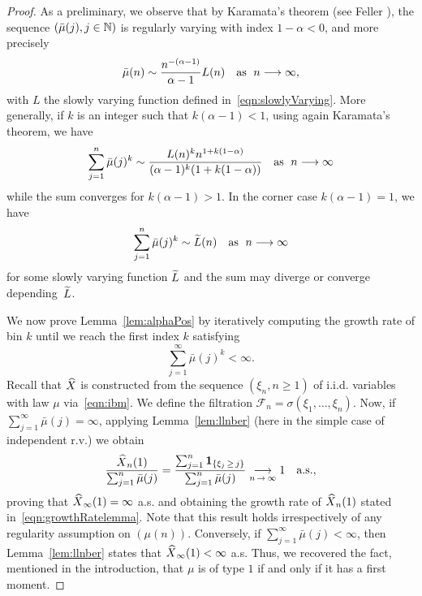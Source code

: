 \documentclass[AHL,Unicode,longabstracts,published]{cedram}
\newcommand{\bbN}{\mathbb{N}}
\newcommand{\ind}[1]{\mathbf{1}_{\left\{#1\right\}}}
\newcommand{\clF}{\mathcal{F}}
\let\originalleft\left
\let\originalright\right
\renewcommand{\left}{\mathopen{}\mathclose\bgroup\originalleft}
\renewcommand{\right}{\aftergroup\egroup\originalright}
\let\oldin\in
\renewcommand{\in}{\mathchoice{\oldin}{\oldin}{\,\oldin\,}{\,\oldin\,}}
\renewcommand*{\to}{\mathchoice{\longrightarrow}{\rightarrow}{\rightarrow}{\rightarrow}}
\let\oldtilde\tilde
\renewcommand*{\tilde}[1]{\mathchoice{\widetilde{#1}}{\widetilde{#1}}{\oldtilde{#1}}{\oldtilde{#1}}}
\let\oldhat\hat
\renewcommand*{\hat}[1]{\mathchoice{\widehat{#1}}{\widehat{#1}}{\oldhat{#1}}{\oldhat{#1}}}
\begin{document}
\begin{proof}
As a preliminary, we observe that by Karamata's theorem (see Feller \cite[Chapter~VIII.9, Theorem~1]{Feller71}), the sequence $(\bar{\mu}(j), j \in \bbN)$ is regularly varying with index $1 - \alpha < 0$, and more precisely
\begin{equation}\label{eqn:theSlowlyVarying}
\bar{\mu}(n) \sim \frac{n^{-(\alpha - 1)}}{\alpha - 1} L(n) \quad \text{as }\; n \to \infty,
\end{equation}
with $L$ the slowly varying function defined in~\eqref{eqn:slowlyVarying}. More generally, if $k$ is an integer such that $k(\alpha-1) < 1$, using again Karamata's theorem, we have
\begin{equation}\label{eqn:theSlowlyVaryingGeneralized}
\sum_{j=1}^n \bar{\mu}(j)^k \sim \frac{L(n)^k n^{1 + k(1-\alpha)}}{(\alpha-1)^k(1 + k(1-\alpha))} \quad\text{as }\; n \to \infty
\end{equation}
while the sum converges for $k(\alpha-1) > 1$. In the corner case $k(\alpha-1) = 1$, we have
\begin{equation}\label{eqn:theSlowlyVaryingGeneralized2}
\sum_{j=1}^n \bar{\mu}(j)^k \sim \tilde{L}(n)\quad\text{as }\; n \to \infty
\end{equation}
for some slowly varying function $\tilde{L}$ and the sum may diverge or converge depen\-ding~$\tilde{L}$.


We now prove Lemma~\ref{lem:alphaPos} by iteratively computing the growth rate of bin $k$ until we reach the first index $k$ satisfying
\[
\sum_{j=1}^\infty \bar{\mu}(j)^k < \infty.
\]
Recall that $\hat{X}$ is constructed from the sequence $(\xi_n, n\geq 1)$ of i.i.d. variables with law $\mu$ via~\eqref{eqn:ibm}. We define the filtration $\clF_n = \sigma(\xi_1,\ldots, \xi_n)$. Now, if $\sum_{j=1}^\infty \bar{\mu}(j) = \infty$, applying Lemma~\ref{lem:llnber} (here in the simple case of independent r.v.) we obtain
\begin{equation}\label{eqn:growthRateFirst}
\frac{\hat{X}_n(1)}{\sum_{j=1}^n \bar{\mu}(j)} = \frac{\sum_{j=1}^n \ind{\xi_j\,\geq\,j}}{\sum_{j=1}^n \bar{\mu}(j)} \underset{n\,\to\,\infty}{\to} 1 \quad \text{a.s.},
\end{equation}
proving that $\hat{X}_\infty(1) = \infty$ a.s. and obtaining the growth rate of $\hat{X}_n(1)$ stated in~\eqref{eqn:growthRatelemma}. Note that this result holds irrespectively of any regularity assumption on $(\mu(n))$. Conversely, if $\sum_{j=1}^\infty \bar{\mu}(j) < \infty$, then Lemma~\ref{lem:llnber} states that $\hat{X}_\infty(1) < \infty$ a.s. Thus, we recovered the fact, mentioned in the introduction, that $\mu$ is of type $1$ if and only if it has a first moment.


\end{proof}
\end{document}

